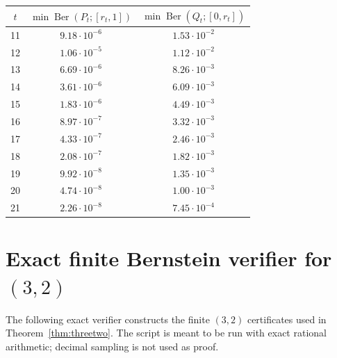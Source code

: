\documentclass[11pt]{article}
\theoremstyle{definition}
\newcommand{\Ber}{\operatorname{Ber}}
\begin{document}
\begin{center}
\begin{tabular}{c|cc}
\toprule
$t$ & $\min \Ber(P_t;[r_t,1])$ & $\min \Ber(Q_t;[0,r_t])$ \\
\midrule
11 & $9.18\cdot10^{-6}$ & $1.53\cdot10^{-2}$ \\
12 & $1.06\cdot10^{-5}$ & $1.12\cdot10^{-2}$ \\
13 & $6.69\cdot10^{-6}$ & $8.26\cdot10^{-3}$ \\
14 & $3.61\cdot10^{-6}$ & $6.09\cdot10^{-3}$ \\
15 & $1.83\cdot10^{-6}$ & $4.49\cdot10^{-3}$ \\
16 & $8.97\cdot10^{-7}$ & $3.32\cdot10^{-3}$ \\
17 & $4.33\cdot10^{-7}$ & $2.46\cdot10^{-3}$ \\
18 & $2.08\cdot10^{-7}$ & $1.82\cdot10^{-3}$ \\
19 & $9.92\cdot10^{-8}$ & $1.35\cdot10^{-3}$ \\
20 & $4.74\cdot10^{-8}$ & $1.00\cdot10^{-3}$ \\
21 & $2.26\cdot10^{-8}$ & $7.45\cdot10^{-4}$ \\
\bottomrule
\end{tabular}
\end{center}


\section{Exact finite Bernstein verifier for $(3,2)$}\label{app:finite-32}

The following exact verifier constructs the finite $(3,2)$ certificates used
in Theorem~\ref{thm:threetwo}.  The script is meant to be run with exact
rational arithmetic; decimal sampling is not used as proof.
\end{document}

